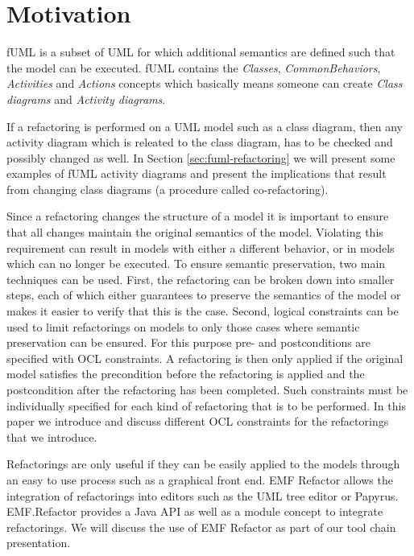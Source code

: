\documentclass{llncs}
\begin{document}
\section{Motivation}
\label{sec:motivation}
fUML is a subset of UML for which additional semantics are defined such that the model can be executed. fUML contains the \textit{Classes}, 
\textit{CommonBehaviors}, \textit{Activities} and \textit{Actions} concepts which basically means someone can create 
\textit{Class diagrams} and \textit{Activity diagrams}.

If a refactoring 
is performed on a UML model such as a class diagram, then any activity diagram which is releated to the class diagram, has 
to be checked and possibly changed as well. In Section \ref{sec:fuml-refactoring} we will present some examples of fUML 
activity diagrams and present the implications that result from changing class 
diagrams (a procedure called co-refactoring).

Since a refactoring changes the structure of a model it is important to ensure that all changes maintain the original 
semantics of the model. Violating this requirement can result in models with either a different behavior, or in models 
which can no longer be executed. To ensure semantic preservation, two main techniques can be used. First, the refactoring 
can be broken down into smaller steps, each of which either guarantees to preserve the semantics of the model or makes it 
easier to verify that this is the case. Second, logical constraints can be used to limit refactorings on models to only 
those cases where semantic preservation can be ensured. For this purpose pre- and postconditions are specified with OCL 
constraints. A refactoring is then only applied if the original model satisfies the precondition before the refactoring is 
applied and the postcondition after the refactoring has been completed. Such constraints must be individually specified 
for each kind of refactoring that is to be performed. In this paper we introduce and discuss different OCL constraints 
for the refactorings that we introduce.

Refactorings are only useful if they can be easily applied to the models through an easy to use process such as a 
graphical front end. EMF Refactor allows the integration of refactorings into editors such as the UML tree editor or 
Papyrus. EMF.Refactor provides a Java API as well as a module concept to integrate refactorings. We will discuss the use 
of EMF Refactor as part of our tool chain presentation.
\end{document}
